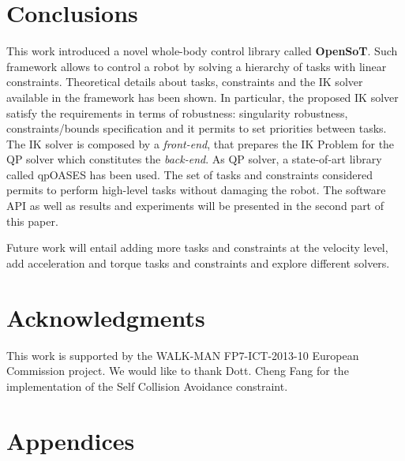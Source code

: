 \section{Conclusions}
\label{sec:conclusions}
This work introduced a novel whole-body control library called \textbf{OpenSoT}. Such framework allows to control a robot by solving a hierarchy of tasks with linear constraints. 
Theoretical details about tasks, constraints and the IK solver available in the framework has been shown. In particular, the proposed IK solver satisfy the requirements in terms of robustness: singularity robustness, constraints/bounds specification and it permits to set priorities between tasks. The IK solver is composed by a \emph{front-end}, that prepares the IK Problem for the QP solver which constitutes the \emph{back-end}. As QP solver, a state-of-art library called qpOASES has been used.
The set of tasks and constraints considered permits to perform high-level tasks without damaging the robot. The software API as well as results and experiments will be presented in the second part of this paper.

Future work will entail adding more tasks and constraints at the velocity level, add acceleration and torque tasks and constraints and explore different solvers.

\section*{Acknowledgments}
This work is supported by the WALK-MAN FP7-ICT-2013-10 European Commission project. We would like to thank Dott. Cheng Fang for the implementation of the Self Collision Avoidance constraint. 

\section{Appendices}

